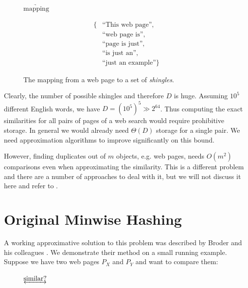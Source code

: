 \documentclass[a4paper]{article}
\begin{document}
\begin{figure}[H]
\begin{center}
\hspace{1cm} $\underrightarrow{\text{mapping}}$ \hspace{1cm}
\parbox{2cm}{
\begin{equation*}
\begin{split}
 \text{\{} & \text{``This web page''},\\ & \text{``web page is''},\\ & \text{``page is just''},\\ & \text{``is just an''},\\ & \text{``just an example''} \text{\}}
\end{split}
\end{equation*}
}
\end{center}
\caption{The mapping from a web page to a set of \emph{shingles}.}
\label{fig:shingle}
\end{figure}

Clearly, the number of possible shingles and therefore $D$ is huge. Assuming $10^5$ different English words, we have $D=\left(10^5\right)^5 \gg 2^{64}$. Thus computing the exact similarities for all pairs of pages of a web search would require prohibitive storage. In general we would already need $\Theta(D)$ storage for a single pair. We need approximation algorithms to improve significantly on this bound.

However, finding duplicates out of $m$ objects, e.g. web pages, needs $O(m^2)$ comparisons even when approximating the similarity. This is a different problem and there are a  number of approaches to deal with it, but we will not discuss it here and refer to \citep{BroderGMZ97,STOC02*380}.

\section{Original Minwise Hashing}

A working approximative solution to this problem was described by Broder and his colleagues \citep{Broder:1998,BroderGMZ97}. We demonstrate their method on a small running example. Suppose we have two web pages $P_X$ and $P_Y$ and want to compare them:

\begin{figure}[H]
\begin{center}
\hspace{1cm} $\underleftrightarrow{\text{similar?}}$ \hspace{1cm}
\end{center}
\end{figure}
\end{document}
